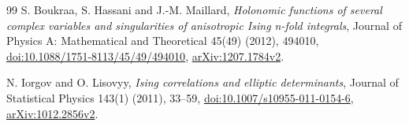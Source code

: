 \documentclass[11pt]{article}
\numberwithin{equation}{section}
\theoremstyle{definition}
\begin{document}
\begin{thebibliography}{99}
S. Boukraa, S. Hassani and J.-M. Maillard,
\emph{Holonomic functions of several complex variables and singularities
of anisotropic Ising n-fold integrals}, Journal of Physics A:
Mathematical and Theoretical 45(49) (2012), 494010,
\href{https://doi.org/10.1088/1751-8113/45/49/494010}{doi:10.1088/1751-8113/45/49/494010},
\href{https://arxiv.org/abs/1207.1784v2}{arXiv:1207.1784v2}.

N. Iorgov and O. Lisovyy,
\emph{Ising correlations and elliptic determinants},
Journal of Statistical Physics 143(1) (2011), 33--59,
\href{https://doi.org/10.1007/s10955-011-0154-6}{doi:10.1007/s10955-011-0154-6},
\href{https://arxiv.org/abs/1012.2856v2}{arXiv:1012.2856v2}.

\end{thebibliography}
\end{document}
